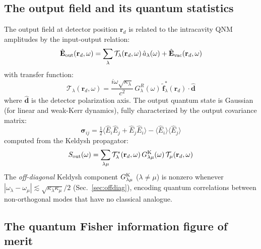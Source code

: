 \documentclass[12pt]{article}
\newcommand{\Keldysh}{{\rm K}}
\newcommand{\tf}{\tilde{\mathbf{f}}}
\begin{document}
\subsection{The output field and its quantum statistics}

The output field at detector position $\mathbf{r}_d$ is related to the
intracavity QNM amplitudes by the input-output relation:
\begin{equation}
  \hat{\mathbf{E}}_{\rm out}(\mathbf{r}_d,\omega) =
  \sum_\lambda \mathcal{T}_\lambda(\mathbf{r}_d,\omega)\,\hat{a}_\lambda(\omega)
  + \hat{\mathbf{E}}_{\rm vac}(\mathbf{r}_d,\omega)
  \label{eq:input_output}
\end{equation}
with transfer function:
\begin{equation}
  \mathcal{T}_\lambda(\mathbf{r}_d,\omega) =
  \frac{i\omega\sqrt{\kappa_\lambda}}{c^2}\,G^R_\lambda(\omega)\,
  \tf_\lambda^*(\mathbf{r}_d)\cdot\hat{\mathbf{d}}
  \label{eq:transfer_fn}
\end{equation}
where $\hat{\mathbf{d}}$ is the detector polarization axis.
The output quantum state is Gaussian (for linear and weak-Kerr dynamics),
fully characterized by the output covariance matrix:
\begin{equation}
  \boldsymbol{\sigma}_{ij} = \tfrac{1}{2}\langle\hat{E}_i\hat{E}_j
  +\hat{E}_j\hat{E}_i\rangle
  - \langle\hat{E}_i\rangle\langle\hat{E}_j\rangle
  \label{eq:covariance}
\end{equation}
computed from the Keldysh propagator:
\begin{equation}
  S_{\rm out}(\omega) =
  \sum_{\lambda\mu}\mathcal{T}_\lambda^*(\mathbf{r}_d,\omega)\,
  G^\Keldysh_{\lambda\mu}(\omega)\,
  \mathcal{T}_\mu(\mathbf{r}_d,\omega)
  \label{eq:output_spectrum}
\end{equation}
The \emph{off-diagonal} Keldysh component $G^\Keldysh_{\lambda\mu}$
($\lambda\neq\mu$) is nonzero whenever $|\omega_\lambda-\omega_\mu|
\lesssim\sqrt{\kappa_\lambda\kappa_\mu}/2$ (Sec.~\ref{sec:offdiag}),
encoding quantum correlations between non-orthogonal modes that have
no classical analogue.

\subsection{The quantum Fisher information figure of merit}
\end{document}
